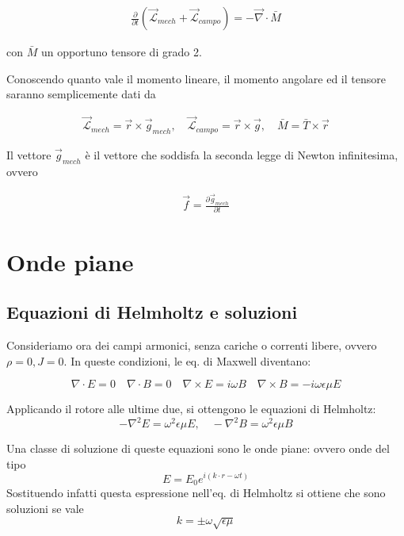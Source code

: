 \documentclass{report}
\begin{document}
\begin{align}
    \frac{\partial}{\partial t}(\vec{\mathcal{L}}_{mech} + \vec{\mathcal{L}}_{campo}) = -\vec{\nabla}\cdot \bar{M}
\end{align}

con \(\bar{M}\) un opportuno tensore di grado 2. 

Conoscendo quanto vale il momento lineare, il momento angolare ed il tensore saranno semplicemente dati da 

\begin{align}
    \vec{\mathcal{L}}_{mech} = \vec{r} \times \vec{g}_{mech}, \quad \vec{\mathcal{L}}_{campo} = \vec{r}\times \vec{g}, \quad \bar{M} = \bar{T} \times \vec{r}
\end{align}

Il vettore \(\vec{g}_{mech}\) è il vettore che soddisfa la seconda legge di Newton infinitesima, ovvero 

\begin{align}
    \vec{f} = \frac{\partial \vec{g}_{mech}}{\partial t}
\end{align}


\newpage
\chapter{Onde piane}

\section{Equazioni di Helmholtz e soluzioni}

Consideriamo ora dei campi armonici, senza cariche o correnti libere, ovvero $\rho=0, J=0$. In queste condizioni, le eq. di Maxwell diventano: 

\begin{equation}
    \nabla \cdot E = 0 \quad \nabla\cdot B = 0 \quad \nabla \times E = i\omega B \quad \nabla \times B = -i\omega \epsilon\mu E
\end{equation}

Applicando il rotore alle ultime due, si ottengono le equazioni di Helmholtz: 
\begin{equation}
    -\nabla^2E = \omega^2\epsilon\mu E, \quad -\nabla^2B = \omega^2\epsilon\mu B 
\end{equation}

Una classe di soluzione di queste equazioni sono le onde piane: ovvero onde del tipo 
\begin{equation}
    E = E_0 e^{i(k\cdot r - \omega t)}
\end{equation}
Sostituendo infatti questa espressione nell'eq. di Helmholtz si ottiene che sono soluzioni se vale 
\begin{equation}
    k = \pm \omega\sqrt{\epsilon\mu}
\end{equation}
\end{document}
